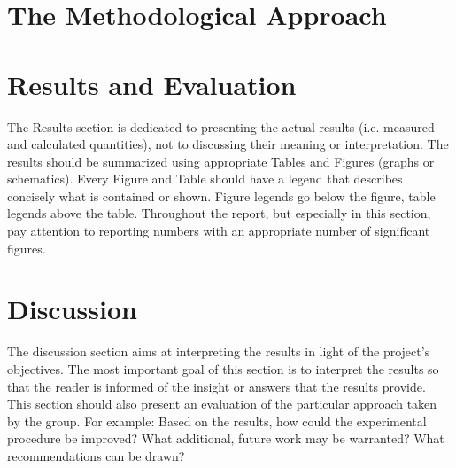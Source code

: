 \section{The Methodological Approach}
\section{Results and Evaluation}
The Results section is dedicated to presenting the actual results (i.e. measured and calculated quantities), not to discussing their meaning or interpretation. The results should be summarized using appropriate Tables and Figures (graphs or schematics). Every Figure and Table should have a legend that describes concisely what is contained or shown. Figure legends go below the figure, table legends above the table. Throughout the report, but especially in this section, pay attention to reporting numbers with an appropriate number of significant figures. 

\section{Discussion}
The discussion section aims at interpreting the results in light of the project's objectives. The most important goal of this section is to interpret the results so that the reader is informed of the insight or answers that the results provide. This section should also present an evaluation of the particular approach taken by the group. For example: Based on the results, how could the experimental procedure be improved? What additional, future work may be warranted? What recommendations can be drawn?


